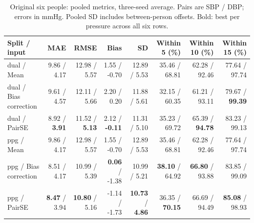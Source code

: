 \begin{table}[t]
\centering\caption{Original six people: pooled metrics, three-seed average. Pairs are SBP / DBP; errors in mmHg. Pooled SD includes between-person offsets. Bold: best per pressure across all six rows.}\label{tab:historical_six_pooled}
\footnotesize
\setlength{\tabcolsep}{4pt}
\begin{tabular}{lrrrrrrr}\toprule
Split / input & MAE & RMSE & Bias & SD & Within 5 (\%) & Within 10 (\%) & Within 15 (\%)\\\midrule
dual / Mean & 9.86 / 4.17 & 12.98 / 5.57 & 1.55 / -0.70 & 12.89 / 5.53 & 35.46 / 68.81 & 62.28 / 92.46 & 77.64 / 97.74\\
dual / Bias correction & 9.61 / 4.57 & 12.11 / 5.66 & 2.20 / 0.20 & 11.88 / 5.61 & 32.15 / 60.35 & 61.21 / 93.11 & 79.67 / \textbf{99.39}\\
dual / PairSE & 8.92 / \textbf{3.91} & 11.52 / \textbf{5.13} & 2.12 / \textbf{-0.11} & 11.31 / 5.10 & 35.23 / 69.72 & 65.39 / \textbf{94.78} & 83.23 / 99.13\\
ppg / Mean & 9.86 / 4.17 & 12.98 / 5.57 & 1.55 / -0.70 & 12.89 / 5.53 & 35.46 / 68.81 & 62.28 / 92.46 & 77.64 / 97.74\\
ppg / Bias correction & 8.51 / 4.17 & 10.99 / 5.39 & \textbf{0.06} / -1.38 & 10.99 / 5.21 & \textbf{38.10} / 64.92 & \textbf{66.80} / 93.88 & 83.85 / 99.09\\
ppg / PairSE & \textbf{8.47} / 3.94 & \textbf{10.80} / 5.16 & -1.14 / -1.73 & \textbf{10.73} / \textbf{4.86} & 36.35 / \textbf{70.15} & 66.69 / 94.49 & \textbf{85.08} / 98.93\\
\bottomrule\end{tabular}
\end{table}
